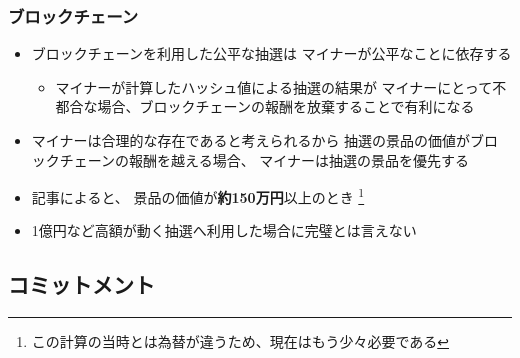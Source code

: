 \begin{frame}
  \frametitle{ブロックチェーン}
 
  \begin{itemize}
    \item ブロックチェーンを利用した公平な抽選は
    マイナーが公平なことに依存する
    \begin{itemize}
      \item マイナーが計算したハッシュ値による抽選の結果が
      マイナーにとって不都合な場合、ブロックチェーンの報酬を放棄することで有利になる
    \end{itemize}
 
    \item マイナーは合理的な存在であると考えられるから
    抽選の景品の価値がブロックチェーンの報酬を越える場合、
    マイナーは抽選の景品を優先する
  \end{itemize}
 
  \begin{center}
  \end{center}
 
  \begin{itemize}
    \item 記事によると、
    景品の価値が\textbf{約150万円}以上のとき%
    \footnote[frame]{この計算の当時とは為替が違うため、現在はもう少々必要である}
 
    \item 1億円など高額が動く抽選へ利用した場合に完璧とは言えない
  \end{itemize}
\end{frame}
 
\subsection{コミットメント}

